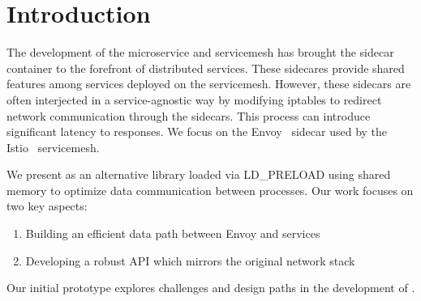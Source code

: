 \section{Introduction}
\label{sec:introduction}
The development of the microservice and servicemesh has brought the sidecar container to the forefront of distributed services.
These sidecares provide shared features among services deployed on the servicemesh.
However, these sidecars are often interjected in a service-agnostic way by modifying iptables to redirect network communication through the sidecars.
This process can introduce significant latency to responses.
We focus on the Envoy~\cite{envoy} sidecar used by the Istio~\cite{istio} servicemesh.

We present \sysname as an alternative library loaded via LD\_PRELOAD using shared memory to optimize data communication between processes.
Our work focuses on two key aspects:
\begin{enumerate}
    \item Building an efficient data path between Envoy and services
    \item Developing a robust API which mirrors the original network stack
\end{enumerate}

Our initial prototype explores challenges and design paths in the development of \sysname.